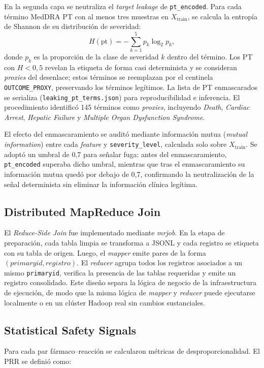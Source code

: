 \documentclass[12pt,a4paper]{article}
\begin{document}
En la segunda capa se neutraliza el \textit{target leakage} de \texttt{pt\_encoded}. Para cada término MedDRA PT con al menos tres muestras en \(X_{\text{train}}\), se calcula la entropía de Shannon de su distribución de severidad:
\begin{equation}
H(\text{pt}) = -\sum_{k=1}^{5} p_k \log_2 p_k,
\end{equation}
donde \(p_k\) es la proporción de la clase de severidad \(k\) dentro del término. Los PT con \(H < 0{,}5\) revelan la etiqueta de forma casi determinista y se consideran \textit{proxies} del desenlace; estos términos se reemplazan por el centinela \texttt{OUTCOME\_PROXY}, preservando los términos legítimos. La lista de PT enmascarados se serializa (\texttt{leaking\_pt\_terms.json}) para reproducibilidad e inferencia. El procedimiento identificó 145 términos como \textit{proxies}, incluyendo \textit{Death}, \textit{Cardiac Arrest}, \textit{Hepatic Failure} y \textit{Multiple Organ Dysfunction Syndrome}.

El efecto del enmascaramiento se auditó mediante información mutua (\textit{mutual information}) entre cada \textit{feature} y \texttt{severity\_level}, calculada solo sobre \(X_{\text{train}}\). Se adoptó un umbral de 0,7 para señalar fuga: antes del enmascaramiento, \texttt{pt\_encoded} superaba dicho umbral, mientras que tras el enmascaramiento su información mutua quedó por debajo de 0,7, confirmando la neutralización de la señal determinista sin eliminar la información clínica legítima.

\subsection{Distributed MapReduce Join}
El \textit{Reduce-Side Join} fue implementado mediante \textit{mrjob}. En la etapa de preparación, cada tabla limpia se transforma a JSONL y cada registro se etiqueta con su tabla de origen. Luego, el \textit{mapper} emite pares de la forma \((primaryid, registro)\). El \textit{reducer} agrupa todos los registros asociados a un mismo \texttt{primaryid}, verifica la presencia de las tablas requeridas y emite un registro consolidado. Este diseño separa la lógica de negocio de la infraestructura de ejecución, de modo que la misma lógica de \textit{mapper} y \textit{reducer} puede ejecutarse localmente o en un clúster Hadoop real sin cambios sustanciales.

\subsection{Statistical Safety Signals}
Para cada par fármaco--reacción se calcularon métricas de desproporcionalidad. El PRR se definió como:
\end{document}
